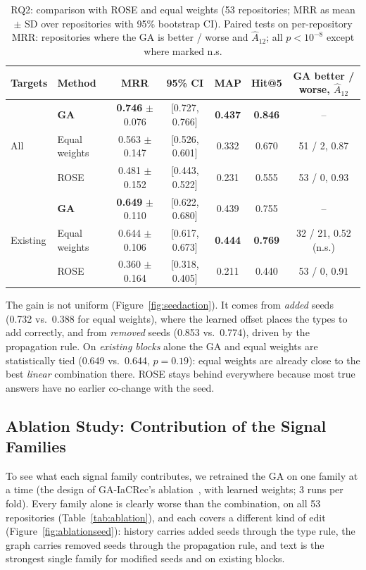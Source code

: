 \begin{table}[ht]
\setlength{\tabcolsep}{4pt}
\begin{tabular}{@{}llccccc@{}}
\toprule
Targets & Method & MRR & 95\% CI & MAP & Hit@5 & GA better / worse, $\hat{A}_{12}$ \\
\midrule
\multirow{3}{*}{All}
 & \textbf{GA}   & \textbf{0.746} $\pm$ 0.076 & [0.727, 0.766] & \textbf{0.437} & \textbf{0.846} & -- \\
 & Equal weights & 0.563 $\pm$ 0.147 & [0.526, 0.601] & 0.332 & 0.670 & 51 / 2, 0.87 \\
 & ROSE          & 0.481 $\pm$ 0.152 & [0.443, 0.522] & 0.231 & 0.555 & 53 / 0, 0.93 \\
\midrule
\multirow{3}{*}{Existing}
 & \textbf{GA}   & \textbf{0.649} $\pm$ 0.110 & [0.622, 0.680] & 0.439 & 0.755 & -- \\
 & Equal weights & 0.644 $\pm$ 0.106 & [0.617, 0.673] & \textbf{0.444} & \textbf{0.769} & 32 / 21, 0.52 (n.s.) \\
 & ROSE          & 0.360 $\pm$ 0.164 & [0.318, 0.405] & 0.211 & 0.440 & 53 / 0, 0.91 \\
\bottomrule
\end{tabular}
\centering
\small
\caption{RQ2: comparison with ROSE and equal weights (53 repositories; MRR as mean $\pm$ SD over
repositories with 95\% bootstrap CI). Paired tests on per-repository MRR: repositories where the GA
is better / worse and $\hat{A}_{12}$; all $p < 10^{-8}$ except where marked n.s.}
\label{tab:rq2}
\end{table}

The gain is not uniform (Figure~\ref{fig:seedaction}). It comes from \emph{added} seeds (0.732 vs.\
0.388 for equal weights), where the learned offset places the types to add correctly, and from
\emph{removed} seeds (0.853 vs.\ 0.774), driven by the propagation rule. On \emph{existing blocks}
alone the GA and equal weights are statistically tied (0.649 vs.\ 0.644, $p = 0.19$): equal
weights are already close to the best \emph{linear} combination there. ROSE stays behind everywhere
because most true answers have no earlier co-change with the seed.

\subsection{Ablation Study: Contribution of the Signal Families}
\label{sec:ablation}

To see what each signal family contributes, we retrained the GA on one family at a time (the
design of GA-IaCRec's ablation~\cite{bessghaier2026iacrec}, with learned weights; 3 runs per fold).
Every family alone is clearly worse than the combination, on all 53 repositories
(Table~\ref{tab:ablation}), and each covers a different kind of edit
(Figure~\ref{fig:ablationseed}): history carries added seeds through the type rule, the graph
carries removed seeds through the propagation rule, and text is the strongest single family for
modified seeds and on existing blocks.

